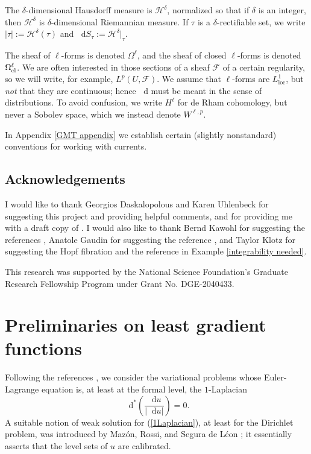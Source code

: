 \documentclass[reqno,11pt]{amsart}
\newcommand*\dif{\mathop{}\!\mathrm{d}}
\newcommand{\loc}{\mathrm{loc}}
\theoremstyle{definition}
\numberwithin{equation}{section}
\begin{document}
The $\delta$-dimensional Hausdorff measure is $\mathcal H^\delta$, normalized so that if $\delta$ is an integer, then $\mathcal H^\delta$ is $\delta$-dimensional Riemannian measure.
If $\tau$ is a $\delta$-rectifiable set, we write $|\tau| := \mathcal H^\delta(\tau)$ and $\dif S_\tau := \mathcal H^\delta|_\tau$.

The sheaf of $\ell$-forms is denoted $\Omega^\ell$, and the sheaf of closed $\ell$-forms is denoted $\Omega^\ell_{\rm cl}$.
We are often interested in those sections of a sheaf $\mathscr F$ of a certain regularity, so we will write, for example, $L^p(U, \mathscr F)$.
We assume that $\ell$-forms are $L^1_\loc$, but \emph{not} that they are continuous; hence $\dif$ must be meant in the sense of distributions.
To avoid confusion, we write $H^\ell$ for de Rham cohomology, but never a Sobolev space, which we instead denote $W^{\ell, p}$.

In Appendix \ref{GMT appendix} we establish certain (slightly nonstandard) conventions for working with currents.

\subsection{Acknowledgements}
I would like to thank Georgios Daskalopolous and Karen Uhlenbeck for suggesting this project and providing helpful comments, and for providing me with a draft copy of \cite{daskalopoulos2023}.
I would also like to thank Bernd Kawohl for suggesting the references \cite{Kawohl2003, Grieser05}, Anatole Gaudin for suggesting the reference \cite{Costabel2010}, and Taylor Klotz for suggesting the Hopf fibration and the reference \cite{Peralta_Salas_2023} in Example \ref{integrability needed}.

This research was supported by the National Science Foundation's Graduate Research Fellowship Program under Grant No. DGE-2040433.

\section{Preliminaries on least gradient functions}\label{prevResults}
Following the references \cite{Mazon14, BackusCML}, we consider the variational problems whose Euler-Lagrange equation is, at least at the formal level, the $1$-Laplacian
\begin{equation}\label{1Laplacian}
\dif^*\left(\frac{\dif u}{|\dif u|}\right) = 0.
\end{equation}
A suitable notion of weak solution for (\ref{1Laplacian}), at least for the Dirichlet problem, was introduced by Maz\'on, Rossi, and Segura de L\'eon \cite{Mazon14}; it essentially asserts that the level sets of $u$ are calibrated.
\end{document}
